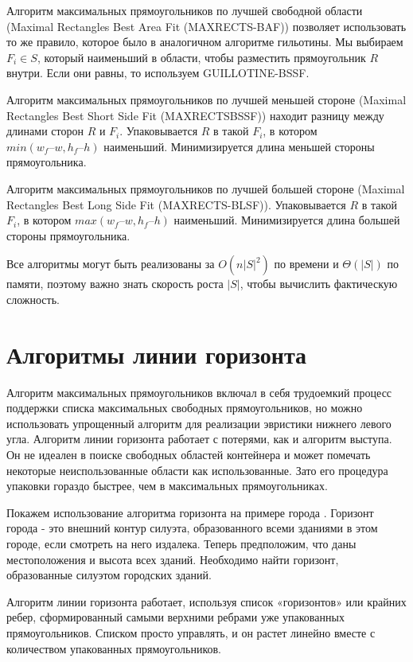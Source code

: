 \documentclass[a4paper,12pt]{report}
\theoremstyle{remark}
\begin{document}
Алгоритм максимальных прямоугольников по лучшей свободной области (Maximal Rectangles Best Area Fit (MAXRECTS-BAF)) позволяет использовать то же правило, которое было в аналогичном алгоритме гильотины. Мы выбираем $F_i \in S$, который наименьший в области, чтобы  разместить прямоугольник $R$ внутри. Если они равны, то используем  GUILLOTINE-BSSF.

Алгоритм максимальных прямоугольников по лучшей меньшей стороне (Maximal Rectangles Best Short Side Fit (MAXRECTSBSSF)) находит разницу между длинами сторон $R$ и $F_i$. Упаковывается $R$ в такой $F_i$, в котором $min(w_f – w, h_f – h)$ наименьший. Минимизируется длина меньшей стороны прямоугольника.

Алгоритм максимальных прямоугольников по лучшей большей стороне (Maximal Rectangles Best Long Side Fit (MAXRECTS-BLSF)). Упаковывается $R$ в такой $F_i$, в котором $max(w_f – w, h_f – h)$ наименьший. Минимизируется длина большей стороны прямоугольника.

Все алгоритмы могут быть реализованы за $O(n|S|^2)$ по времени и $\Theta(|S|)$ по памяти, поэтому важно знать скорость роста $|S|$, чтобы вычислить фактическую сложность.

\section{Алгоритмы линии горизонта}

Алгоритм максимальных прямоугольников включал в себя трудоемкий процесс поддержки списка максимальных свободных прямоугольников, но можно использовать упрощенный алгоритм для реализации эвристики нижнего левого угла. Алгоритм линии горизонта\citep{Jylanki} работает с потерями, как и алгоритм выступа. Он не идеален в поиске свободных областей контейнера и может помечать некоторые неиспользованные области как использованные. Зато его процедура упаковки гораздо быстрее, чем в максимальных прямоугольниках.

Покажем использование алгоритма горизонта на примере города \citep{skyline}. Горизонт города - это внешний контур силуэта, образованного всеми зданиями в этом городе, если смотреть на него издалека. Теперь предположим, что даны местоположения и высота всех зданий. Необходимо найти горизонт, образованные силуэтом городских зданий.

Алгоритм линии горизонта работает, используя список «горизонтов» или крайних ребер, сформированный самыми верхними ребрами уже упакованных прямоугольников. Списком просто управлять, и он растет линейно вместе с количеством упакованных прямоугольников.
\end{document}
